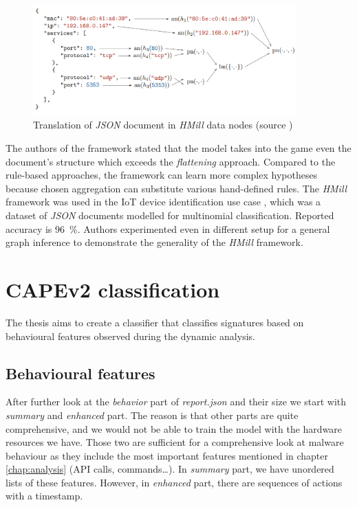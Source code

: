 
\begin{figure}[h]
    \centering
    \includegraphics[width=0.9\textwidth]{figures/translation.png}
    \caption{Translation of \emph{JSON} document in \emph{HMill} data nodes (source \cite{Mandlik2020})}
    \label{fig:jsonhmill}
\end{figure}

The authors of the framework stated that the model takes into the game even the document's structure which exceeds the \emph{flattening} approach. Compared to the rule-based approaches, the framework can learn more complex hypotheses because chosen aggregation can substitute various hand-defined rules. The \emph{HMill} framework was used in the IoT device identification use case \cite{Mandlik2020}, which was a dataset of \emph{JSON} documents modelled for multinomial classification. Reported accuracy is $96$~\%. Authors experimented even in different setup for a general graph inference to demonstrate the generality of the \emph{HMill} framework.


\section{CAPEv2 classification}
The thesis aims to create a classifier that classifies signatures based on behavioural features observed during the dynamic analysis.

\subsection{Behavioural features}
After further look at the \emph{behavior} part of \emph{report.json} and their size we start with \emph{summary} and \emph{enhanced} part. The reason is that other parts are quite comprehensive, and we would not be able to train the model with the hardware resources we have. Those two are sufficient for a comprehensive look at malware behaviour as they include the most important features mentioned in chapter \ref{chap:analysis} (API calls, commands\dots). In \emph{summary} part, we have unordered lists of these features. However, in \emph{enhanced} part, there are sequences of actions with a timestamp.

